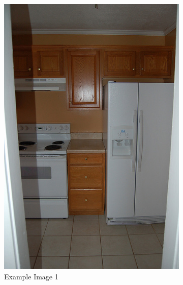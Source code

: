 \begin{figure}[H]
    \centering
    \begin{subfigure}{0.49\textwidth}
        \centering
        \includegraphics[width=\textwidth]{Images/External_datasets/coco_1.jpg}
        \caption{\centering Example Image 1}
    \end{subfigure}
    \hfill
    \begin{subfigure}{0.49\textwidth}
        \centering

\end{subfigure}
\end{figure}
